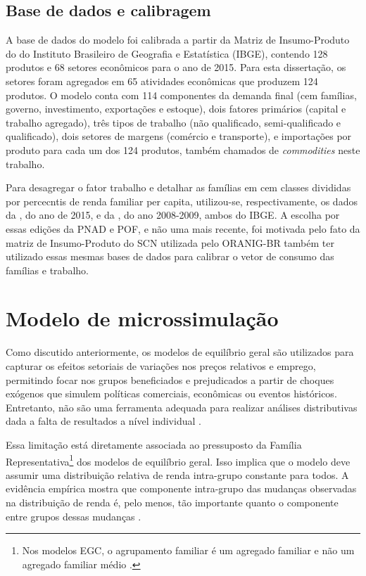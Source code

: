 \subsection{Base de dados e calibragem} \label{sec:dados_egc}

A base de dados do modelo foi calibrada a partir da Matriz de Insumo-Produto do  do Instituto Brasileiro de Geografia e Estatística (IBGE), contendo 128 produtos e 68 setores econômicos para o ano de 2015. Para esta dissertação, os setores foram agregados em 65 atividades econômicas que produzem 124 produtos. O modelo conta com 114 componentes da demanda final (cem famílias, governo, investimento, exportações e estoque), dois fatores primários (capital e trabalho agregado), três tipos de trabalho (não qualificado, semi-qualificado e qualificado), dois setores de margens (comércio e transporte), e importações por produto para cada um dos 124 produtos, também chamados de \textit{commodities} neste trabalho.

Para desagregar o fator trabalho e detalhar as famílias em cem classes divididas por percecntis de renda familiar per capita, utilizou-se, respectivamente, os dados da , do ano de 2015, e da , do ano 2008-2009, ambos do IBGE. A escolha por essas edições da PNAD e POF, e não uma mais recente, foi motivada pelo fato da matriz de Insumo-Produto do SCN utilizada pelo ORANIG-BR também ter utilizado essas mesmas bases de dados para calibrar o vetor de consumo das famílias e trabalho.



\section{Modelo de microssimulação} \label{sec:microssimulacao}

Como discutido anteriormente, os modelos de equilíbrio geral são utilizados para capturar os efeitos setoriais de variações nos preços relativos e emprego, permitindo focar nos grupos beneficiados e prejudicados a partir de choques exógenos que simulem políticas comerciais, econômicas ou eventos históricos. Entretanto, não são uma ferramenta adequada para realizar análises distributivas dada a falta de resultados a nível individual \cite{tiberti17}.

Essa limitação está diretamente associada ao pressuposto da Família Representativa\footnote{Nos modelos EGC, o agrupamento familiar é um agregado familiar e não um agregado familiar médio \cite{tiberti17}.} dos modelos de equilíbrio geral. Isso implica que o modelo deve assumir uma distribuição relativa de renda intra-grupo constante para todos. A evidência empírica mostra que componente intra-grupo das mudanças observadas na distribuição de renda é, pelo menos, tão importante quanto o componente entre grupos dessas mudanças \cite{colombo08}.

